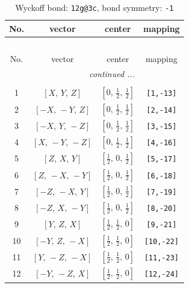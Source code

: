 \documentclass[fleqn,8pt]{jsarticle}
\begin{document}
\begin{longtable}{cccc}
\caption{Wyckoff bond: {\tt 12g@3c}, bond symmetry: {\tt -1}}
 \\
 \hline \hline
No. & vector & center & mapping \\ \hline \endfirsthead

\multicolumn{3}{l}{\tablename\ \thetable{}} \\
 \hline \hline
No. & vector & center & mapping \\ \hline \endhead

 \hline \hline
\multicolumn{3}{r}{\footnotesize\it continued ...} \\ \endfoot

 \hline \hline
\multicolumn{3}{r}{} \\ \endlastfoot

1 & $\left[ X,\, Y,\, Z \right]$ & $\left[ 0,\, \frac{1}{2},\, \frac{1}{2} \right]$ & {\tt [1,-13]} \\ \hline
2 & $\left[ - X,\, - Y,\, Z \right]$ & $\left[ 0,\, \frac{1}{2},\, \frac{1}{2} \right]$ & {\tt [2,-14]} \\ \hline
3 & $\left[ - X,\, Y,\, - Z \right]$ & $\left[ 0,\, \frac{1}{2},\, \frac{1}{2} \right]$ & {\tt [3,-15]} \\ \hline
4 & $\left[ X,\, - Y,\, - Z \right]$ & $\left[ 0,\, \frac{1}{2},\, \frac{1}{2} \right]$ & {\tt [4,-16]} \\ \hline
5 & $\left[ Z,\, X,\, Y \right]$ & $\left[ \frac{1}{2},\, 0,\, \frac{1}{2} \right]$ & {\tt [5,-17]} \\ \hline
6 & $\left[ Z,\, - X,\, - Y \right]$ & $\left[ \frac{1}{2},\, 0,\, \frac{1}{2} \right]$ & {\tt [6,-18]} \\ \hline
7 & $\left[ - Z,\, - X,\, Y \right]$ & $\left[ \frac{1}{2},\, 0,\, \frac{1}{2} \right]$ & {\tt [7,-19]} \\ \hline
8 & $\left[ - Z,\, X,\, - Y \right]$ & $\left[ \frac{1}{2},\, 0,\, \frac{1}{2} \right]$ & {\tt [8,-20]} \\ \hline
9 & $\left[ Y,\, Z,\, X \right]$ & $\left[ \frac{1}{2},\, \frac{1}{2},\, 0 \right]$ & {\tt [9,-21]} \\ \hline
10 & $\left[ - Y,\, Z,\, - X \right]$ & $\left[ \frac{1}{2},\, \frac{1}{2},\, 0 \right]$ & {\tt [10,-22]} \\ \hline
11 & $\left[ Y,\, - Z,\, - X \right]$ & $\left[ \frac{1}{2},\, \frac{1}{2},\, 0 \right]$ & {\tt [11,-23]} \\ \hline
12 & $\left[ - Y,\, - Z,\, X \right]$ & $\left[ \frac{1}{2},\, \frac{1}{2},\, 0 \right]$ & {\tt [12,-24]} \\
\end{longtable}
\end{document}
